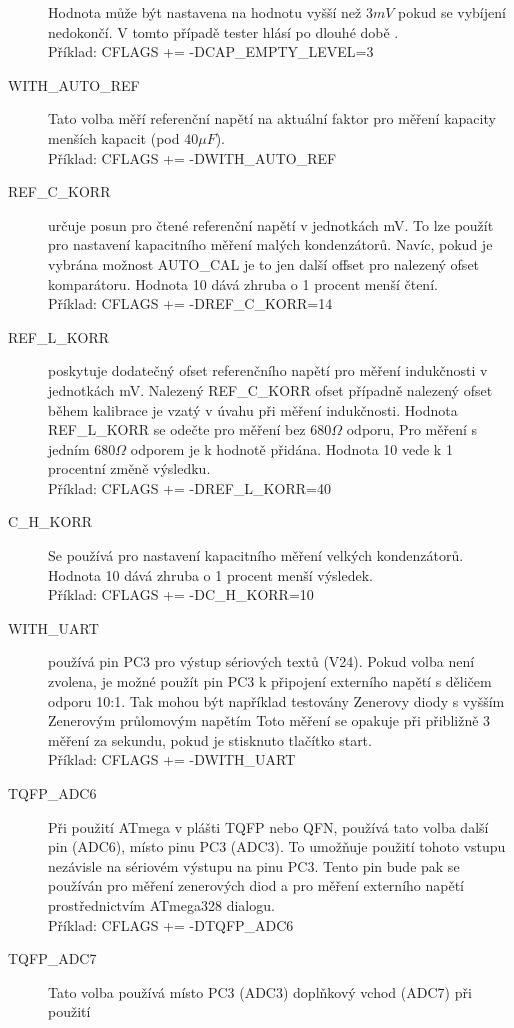 \begin{description}
Hodnota může být nastavena na hodnotu vyšší než \(3mV\) pokud se vybíjení nedokončí.
V tomto případě tester hlásí po dlouhé době .\\
Příklad: CFLAGS += -DCAP\_EMPTY\_LEVEL=3
  \item[WITH\_AUTO\_REF] Tato volba měří referenční napětí na aktuální faktor pro měření kapacity
menších kapacit (pod \(40\mu F\)).\\
Příklad: CFLAGS += -DWITH\_AUTO\_REF
  \item[REF\_C\_KORR] určuje posun pro čtené referenční napětí v jednotkách mV.
To lze použít pro nastavení kapacitního měření malých kondenzátorů.
Navíc, pokud je vybrána možnost AUTO\_CAL je to jen další offset pro
nalezený ofset komparátoru.
Hodnota 10 dává zhruba o 1 procent menší čtení.\\
Příklad: CFLAGS += -DREF\_C\_KORR=14
  \item[REF\_L\_KORR] poskytuje dodatečný ofset referenčního napětí pro měření indukčnosti
v jednotkách mV. Nalezený REF\_C\_KORR ofset případně nalezený ofset během kalibrace
je vzatý v úvahu při měření indukčnosti.
Hodnota REF\_L\_KORR se odečte pro měření bez \(680\Omega\) odporu,
Pro měření s jedním \(680\Omega\) odporem je  k hodnotě přidána.
Hodnota 10 vede k 1 procentní změně výsledku.\\
Příklad: CFLAGS += -DREF\_L\_KORR=40
  \item[C\_H\_KORR] Se používá pro nastavení kapacitního měření velkých kondenzátorů.
Hodnota 10 dává zhruba o 1 procent menší výsledek.\\
Příklad: CFLAGS += -DC\_H\_KORR=10
  \item[WITH\_UART] používá pin PC3 pro výstup sériových textů (V24). Pokud volba není zvolena,
je možné použít pin PC3 k připojení externího napětí s děličem odporu 10:1.
Tak mohou být například testovány Zenerovy diody s vyšším Zenerovým průlomovým napětím
Toto měření se opakuje při přibližně 3 měření za sekundu, pokud je stisknuto tlačítko start.\\
Příklad: CFLAGS += -DWITH\_UART
  \item[TQFP\_ADC6] Při použití ATmega v plášti TQFP nebo QFN, používá tato volba další pin (ADC6),
místo pinu PC3 (ADC3).
To umožňuje použití tohoto vstupu nezávisle na sériovém výstupu na pinu PC3.
Tento pin bude pak se používán pro měření zenerových diod a pro měření externího napětí
prostřednictvím  ATmega328 dialogu.\\
Příklad: CFLAGS += -DTQFP\_ADC6
  \item[TQFP\_ADC7] Tato volba používá místo PC3 (ADC3) doplňkový vchod (ADC7) při použití

\end{description}
